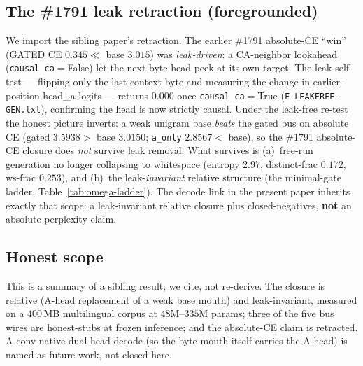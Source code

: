 \subsection{The \#1791 leak retraction (foregrounded)}
\label{app:omega-leak}

We import the sibling paper's retraction. The earlier \#1791 absolute-CE
``win'' (GATED CE $0.345\ll$ base $3.015$) was \emph{leak-driven}: a CA-neighbor
lookahead (\texttt{causal\_ca}$=$False) let the next-byte head peek at its own
target. The leak self-test --- flipping only the last context byte and measuring
the change in earlier-position head\_a logits --- returns \textbf{$0.000$} once
\texttt{causal\_ca}$=$True (\texttt{F-LEAKFREE-GEN.txt}), confirming the head is
now strictly causal. Under the leak-free re-test the honest picture inverts: a
weak unigram base \emph{beats} the gated bus on absolute CE (gated $3.5938 >$
base $3.0150$; \texttt{a\_only} $2.8567 <$ base), so the \#1791 absolute-CE
closure does \emph{not} survive leak removal. What survives is
(a)~free-run generation no longer collapsing to whitespace (entropy $2.97$,
distinct-frac $0.172$, ws-frac $0.253$), and (b)~the leak-\emph{invariant}
relative structure (the minimal-gate ladder, Table~\ref{tab:omega-ladder}). The
decode link in the present paper inherits exactly that scope: a leak-invariant
relative closure plus closed-negatives, \textbf{not} an absolute-perplexity claim.

\subsection{Honest scope}
\label{app:omega-scope}

This is a summary of a sibling result; we cite, not re-derive. The closure is
relative (A-head replacement of a weak base mouth) and leak-invariant, measured
on a $400$\,MB multilingual corpus at $48$M--$335$M params; three of the five
bus wires are honest-stubs at frozen inference; and the absolute-CE claim is
retracted. A conv-native dual-head decode (so the byte mouth itself carries the
A-head) is named as future work, not closed here.
